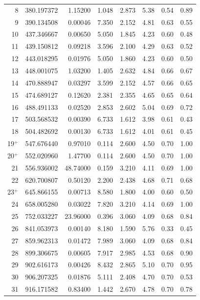 \begin{longtable}{rrrrrrrr}
8      & 380.197372 & 1.15200 & 1.048 & 2.873 & 5.38 & 0.54 & 0.89 \\
9      & 390.134508 & 0.00046 & 7.350 & 2.152 & 4.81 & 0.63 & 0.55 \\
10     & 437.346667 & 0.00650 & 5.050 & 1.845 & 4.23 & 0.60 & 0.48 \\
11     & 439.150812 & 0.09218 & 3.596 & 2.100 & 4.29 & 0.63 & 0.52 \\
12     & 443.018295 & 0.01976 & 5.050 & 1.860 & 4.23 & 0.60 & 0.50 \\
13     & 448.001075 & 1.03200 & 1.405 & 2.632 & 4.84 & 0.66 & 0.67 \\
14     & 470.888947 & 0.03297 & 3.599 & 2.152 & 4.57 & 0.66 & 0.65 \\
15     & 474.689127 & 0.12620 & 2.381 & 2.355 & 4.65 & 0.65 & 0.64 \\
16     & 488.491133 & 0.02520 & 2.853 & 2.602 & 5.04 & 0.69 & 0.72 \\
17     & 503.568532 & 0.00390 & 6.733 & 1.612 & 3.98 & 0.61 & 0.43 \\
18     & 504.482692 & 0.00130 & 6.733 & 1.612 & 4.01 & 0.61 & 0.45 \\
19$^+$ & 547.676440 & 0.97010 & 0.114 & 2.600 & 4.50 & 0.70 & 1.00 \\
20$^+$ & 552.020960 & 1.47700 & 0.114 & 2.600 & 4.50 & 0.70 & 1.00 \\
21     & 556.936002 & 48.74000& 0.159 & 3.210 & 4.11 & 0.69 & 1.00 \\
22     & 620.700807 & 0.50120 & 2.200 & 2.438 & 4.68 & 0.71 & 0.68 \\
23$^+$ & 645.866155 & 0.00713 & 8.580 & 1.800 & 4.00 & 0.60 & 0.50 \\
24     & 658.005280 & 0.03022 & 7.820 & 3.210 & 4.14 & 0.69 & 1.00 \\
25     & 752.033227 & 23.96000& 0.396 & 3.060 & 4.09 & 0.68 & 0.84 \\
26     & 841.053973 & 0.00140 & 8.180 & 1.590 & 5.76 & 0.33 & 0.45 \\
27     & 859.962313 & 0.01472 & 7.989 & 3.060 & 4.09 & 0.68 & 0.84 \\
28     & 899.306675 & 0.00605 & 7.917 & 2.985 & 4.53 & 0.68 & 0.90 \\
29     & 902.616173 & 0.00426 & 8.432 & 2.865 & 5.10 & 0.70 & 0.95 \\
30     & 906.207325 & 0.01876 & 5.111 & 2.408 & 4.70 & 0.70 & 0.53 \\
31     & 916.171582 & 0.83400 & 1.442 & 2.670 & 4.78 & 0.70 & 0.78 \\

\end{longtable}
